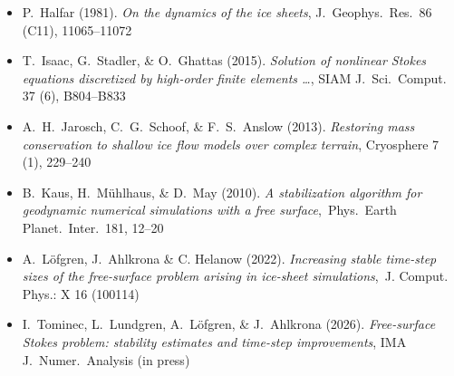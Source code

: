 \begin{itemize}

\item P.~Halfar (1981). \emph{On the dynamics of the ice sheets}, J.~Geophys.~Res.~86 (C11), 11065--11072

\item T.~Isaac, G.~Stadler, \& O.~Ghattas (2015). \emph{Solution of nonlinear Stokes equations discretized by high-order finite elements \dots}, SIAM J.~Sci.~Comput. 37 (6), B804--B833 

\item A.~H.~Jarosch, C.~G.~Schoof, \& F.~S.~Anslow (2013). \emph{Restoring mass conservation to shallow ice flow models over complex terrain}, Cryosphere 7 (1), 229--240 


\item B.~Kaus, H.~M\"uhlhaus, \& D.~May (2010). \emph{A stabilization algorithm for geodynamic numerical simulations with a free surface},~Phys.~Earth Planet.~Inter.~181, 12--20 

\item A.~L{\"o}fgren, J.~Ahlkrona \& C. Helanow (2022). \emph{Increasing stable time-step sizes of the free-surface problem arising in ice-sheet simulations},~J. Comput. Phys.: X 16 (100114) 

\item I.~Tominec, L.~Lundgren, A.~L{\"o}fgren, \& J.~Ahlkrona (2026). \emph{Free-surface Stokes problem: stability estimates and time-step improvements}, IMA J.~Numer.~Analysis (in press)
\end{itemize}
